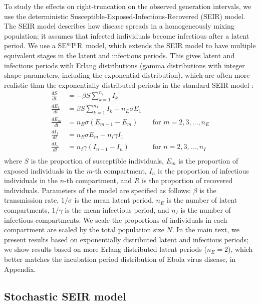 \documentclass[12pt]{article}
\newcommand{\seminar}{SE\mbox{$^m$}I\mbox{$^n$}R}
\begin{document}
To study the effects on right-truncation on the observed generation intervals, we use the deterministic Susceptible-Exposed-Infectious-Recovered (SEIR) model.
The SEIR model describes how disease spreads in a homogeneously mixing population; it assumes that infected individuals become infectious after a latent period.
We use a \seminar\ model, which extends the SEIR model to have multiple equivalent stages in the latent and infectious periods. This gives latent and infectious periods with Erlang distributions (gamma distributions with integer shape parameters, including the exponential distribution), which are often more realistic than the exponentially distributed periods in the standard SEIR model \citep{anderson1980spread, bailey1964some}: 
\begin{equation}
\begin{aligned}
\frac{dS}{dt} &= - \beta S \sum_{k=1}^{n_I} I_k\\
\frac{dE_1}{dt} &= \beta S \sum_{k=1}^{n_I} I_k - n_E \sigma E_1\\
\frac{dE_m}{dt} &= n_E \sigma (E_{m-1} - E_m) && \text{for } m = 2, 3, \dots, n_E\\
\frac{dI_1}{dt} &= n_E \sigma E_m - n_I \gamma I_1\\
\frac{dI_n}{dt} &= n_I \gamma (I_{n-1} - I_n) && \text{for } n = 2, 3, \dots, n_I\\
\end{aligned}
\end{equation}
where $S$ is the proportion of susceptible individuals, $E_m$ is the proportion of exposed individuals in the $m$-th compartment, $I_n$ is the proportion of infectious individuals in the $n$-th compartment, and $R$ is the proportion of recovered individuals.
Parameters of the model are specified as follows:  $\beta$ is the transmission rate, $1/\sigma$ is the mean latent period, $n_E$ is the number of latent compartments, $1/\gamma$ is the mean infectious period, and $n_I$ is the number of infectious compartments.
We scale the proportions of individuals in each compartment are scaled by the total population size $N$.
In the main text, we present results based on exponentially distributed latent and infectious periods;
we show results based on more Erlang distributed latent periods ($n_E=2$), which better matches the incubation period distribution of Ebola virus disease, in Appendix.

\subsection{Stochastic SEIR model}
\end{document}
